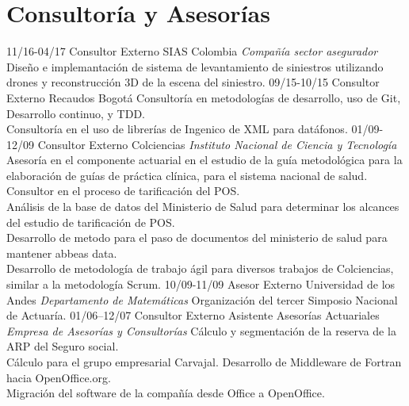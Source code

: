 \section{Consultoría y Asesorías}
\begin{entrylist}
  \entry
    {11/16-04/17}
    {Consultor Externo}
    {SIAS Colombia {\sl Compañía sector asegurador}}
    {Diseño e implemantación de sistema de levantamiento de siniestros utilizando drones y reconstrucción 3D de
     la escena del siniestro.}
  \entry
    {09/15-10/15}
    {Consultor Externo}
    {Recaudos Bogotá}
    {Consultoría en metodologías de desarrollo, uso de Git, Desarrollo continuo, y TDD.\\
     Consultoría en el uso de librerías de Ingenico de XML para datáfonos.}
  \entry
    {01/09-12/09}
    {Consultor Externo}
    {Colciencias {\sl Instituto Nacional de Ciencia y Tecnología}}
    {Asesoría en el componente actuarial en el estudio de la guía metodológica para la elaboración de guías de
     práctica clínica, para el sistema nacional de salud.\\
     Consultor en el proceso de tarificación del POS.\\
     Análisis de la base de datos del Ministerio de Salud para determinar los alcances del estudio de tarificación de POS.\\
     Desarrollo de metodo para el paso de documentos del ministerio de salud para mantener abbeas data.\\
     Desarrollo de metodología de trabajo ágil para diversos trabajos de Colciencias, similar a la metodología Scrum.}
  \entry
    {10/09-11/09}
    {Asesor Externo}
    {Universidad de los Andes \sl{Departamento de Matemáticas}}
    {Organización del tercer Simposio Nacional de Actuaría.}
  \entry
    {01/06–12/07}
    {Consultor Externo Asistente}
    {Asesorías Actuariales {\sl Empresa de Asesorías y Consultorías}}
    {Cálculo y segmentación de la reserva de la ARP del Seguro social.\\
     Cálculo para el grupo empresarial Carvajal. Desarrollo de Middleware de Fortran hacia OpenOffice.org.\\
     Migración del software de la compañía desde Office a OpenOffice.}
\end{entrylist}
